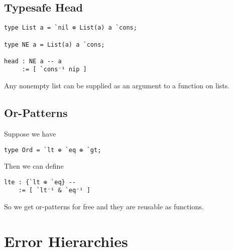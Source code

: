\documentclass{article}
\begin{document}
\subsection{Typesafe Head}

\begin{verbatim}
type List a = `nil ⊕ List(a) a `cons;

type NE a = List(a) a `cons;

head : NE a -- a
     := [ `cons⁻¹ nip ]
\end{verbatim}

Any nonempty list can be supplied as an argument to a function on lists.



\subsection{Or-Patterns}

Suppose we have

\begin{verbatim}
type Ord = `lt ⊕ `eq ⊕ `gt;
\end{verbatim}

Then we can define

\begin{verbatim}
lte : {`lt ⊕ `eq} --
    := [ `lt⁻¹ & `eq⁻¹ ]
\end{verbatim}

So we get or-patterns for free and they are reusable as functions.






\section{Error Hierarchies}




\end{document}
